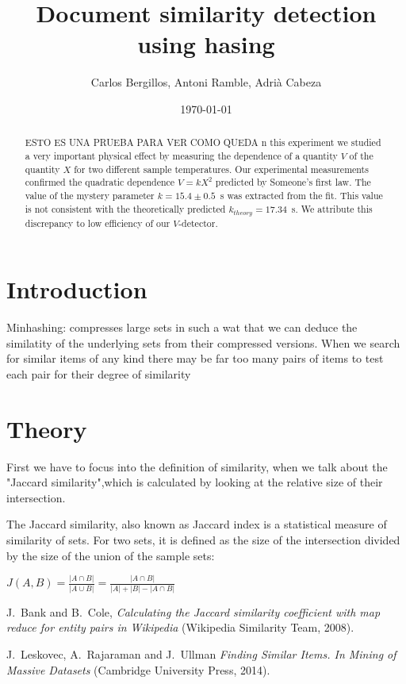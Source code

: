 \documentclass[12pt]{article}
\author{Carlos Bergillos, Antoni Ramble, Adrià Cabeza}
\title{Document similarity detection using hasing }
\date{\today}
\begin{document}
  \maketitle  

  
	\begin{abstract}
ESTO ES UNA PRUEBA PARA VER COMO QUEDA n this experiment we studied a very important physical effect by measuring the
dependence of a quantity $V$ of the quantity $X$ for two different sample
temperatures.  Our experimental measurements confirmed the quadratic dependence
$V = kX^2$ predicted by Someone's first law. The value of the mystery parameter
$k = 15.4\pm 0.5$~s was extracted from the fit. This value is
not consistent with the theoretically predicted $k_{theory}=17.34$~s. We attribute this
discrepancy to low efficiency of our $V$-detector.
\end{abstract}

\newpage
\tableofcontents
\newpage

\section{Introduction}

Minhashing: compresses large sets in such a wat that we can deduce the similatity of the underlying sets from their compressed versions. 
When we search for similar items of any kind there may be far too many pairs of items to test each pair for their degree of similarity

\section{Theory}

First we have to focus into the definition of similarity, when we talk about the "Jaccard similarity",which is calculated by looking at the relative size of their intersection. 

The Jaccard similarity, also known as Jaccard index is a statistical measure of similarity of sets. For two sets, it is defined as the size of the intersection divided by the size of the union of the sample sets:
\medbreak
\centerline{\small $J(A,B)=\frac{\left |A\cap B  \right |}{ \left |A\cup B  \right |} = \frac{\left |A\cap B  \right |}{ \left|A\right|+\left|B\right|-\left |A\cap B  \right |} $}



\begin{thebibliography}{100}

J.\ Bank and B.\ Cole,
\textit {Calculating the Jaccard similarity coefficient with map reduce for entity pairs in
Wikipedia} (Wikipedia Similarity Team, 2008).

J.\ Leskovec, A.\ Rajaraman and J.\ Ullman
\textit{ Finding Similar Items. In Mining of Massive Datasets} (Cambridge University Press, 2014).



\end{thebibliography}
\end{document}
